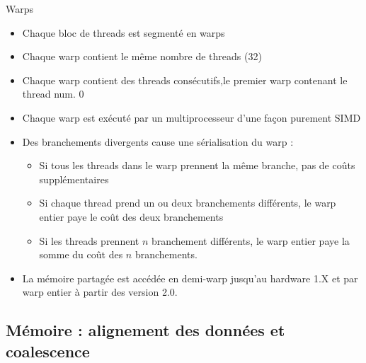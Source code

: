 \documentclass{beamer}
\begin{document}
\begin{frame}{Warps}

\begin{itemize}
\item Chaque bloc de threads est segmenté en warps
\item Chaque warp contient le même nombre de threads (32)
\item Chaque warp contient des threads consécutifs,le premier
  warp contenant le thread num. 0
\item Chaque warp est exécuté par un multiprocesseur d'une façon
  purement SIMD
\item Des branchements divergents cause une sérialisation du warp :
  \begin{itemize}
  \item Si tous les threads dans le warp prennent la même branche, pas de coûts supplémentaires
  \item Si chaque thread prend un ou deux branchements différents, le warp entier
    paye le coût des deux branchements
  \item Si les threads prennent $n$ branchement différents, le warp entier
    paye la somme du coût des $n$ branchements.
  \end{itemize}
\item La mémoire partagée est accédée en demi-warp jusqu'au hardware
  1.X et par warp entier à partir des version 2.0.
\end{itemize}
\end{frame}

\subsection{Mémoire : alignement des données et coalescence}
\end{document}
